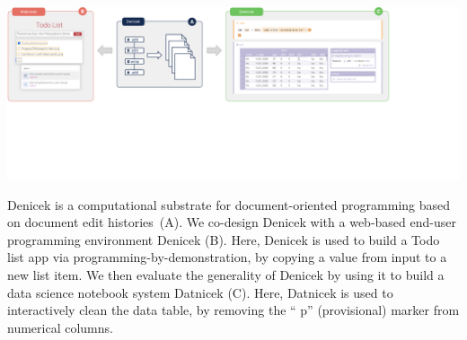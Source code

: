\documentclass[sigconf]{acmart}
\newcommand{\diff}[1]{{#1}}
\begin{document}


\begin{teaserfigure}
  \vspace{0.25em}
  \includegraphics[width=1\textwidth,clip,trim=0cm 8.5cm 7.7cm 0cm]{fig/teaser.pdf}
  \vspace{-1.5em}
  \caption{\diff{Denicek is a computational substrate for document-oriented programming
    based on document edit histories~(A). We co-design Denicek with a web-based end-user
    programming environment Denicek (B). Here, Denicek is used to build a Todo list app via
    programming-by-demonstration, by copying a value from input to a new list item.
    We then evaluate the generality of Denicek by using it to build a data science notebook
    system Datnicek (C). Here, Datnicek is used to interactively clean the data table, by
    removing the `` p'' (provisional) marker from numerical columns.
  }}
  \label{fig:teaser}
  \vspace{0.75em}
\end{teaserfigure}
\maketitle

\end{document}
